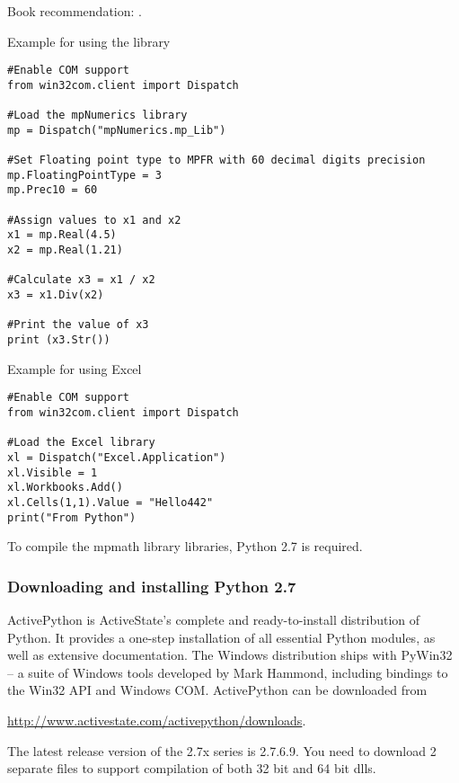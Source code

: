 \vpara
Book recommendation: \cite{McKinney2012}.

\vpara
Example for using the library

\begin{lstlisting}
#Enable COM support
from win32com.client import Dispatch

#Load the mpNumerics library
mp = Dispatch("mpNumerics.mp_Lib")

#Set Floating point type to MPFR with 60 decimal digits precision
mp.FloatingPointType = 3
mp.Prec10 = 60

#Assign values to x1 and x2
x1 = mp.Real(4.5)
x2 = mp.Real(1.21)

#Calculate x3 = x1 / x2
x3 = x1.Div(x2)

#Print the value of x3
print (x3.Str())
\end{lstlisting}

\vpara
Example for using Excel

\begin{lstlisting}
#Enable COM support
from win32com.client import Dispatch

#Load the Excel library
xl = Dispatch("Excel.Application")
xl.Visible = 1
xl.Workbooks.Add() 
xl.Cells(1,1).Value = "Hello442" 
print("From Python")
\end{lstlisting}



To compile the mpmath library libraries, Python 2.7 is required.

\subsubsection{Downloading and installing  Python 2.7}
ActivePython is ActiveState's complete and ready-to-install distribution of Python. It provides a one-step installation of all essential Python modules, as well as extensive documentation. 
The Windows distribution ships with PyWin32 -- a suite of Windows tools developed by Mark Hammond, including bindings to the Win32 API and Windows COM. 
ActivePython can be downloaded from

\vpara
\href{http://www.activestate.com/activepython/downloads}{http://www.activestate.com/activepython/downloads}.

\vpara
The latest release version of the 2.7x series is 2.7.6.9. You need to download 2 separate files to support compilation of both 32 bit and 64 bit dlls.





